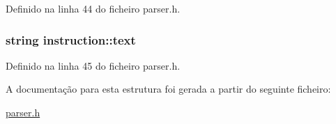 Definido na linha 44 do ficheiro parser.\-h.

\hypertarget{structinstruction_af31af10ecfe7d2fdf154616d0aede8ea}{
\subsubsection[{text}]{\setlength{\rightskip}{0pt plus 5cm}string instruction\-::text}}\label{structinstruction_af31af10ecfe7d2fdf154616d0aede8ea}


Definido na linha 45 do ficheiro parser.\-h.



A documentação para esta estrutura foi gerada a partir do seguinte ficheiro\-:\begin{DoxyCompactItemize}
\item 
\hyperlink{parser_8h}{parser.\-h}\end{DoxyCompactItemize}

